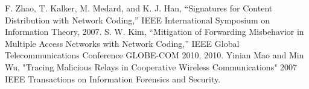 \documentclass[conference]{IEEEtran}
\begin{document}
\begin{thebibliography}{00}
 F. Zhao, T. Kalker, M. Medard, and K. J. Han, “Signatures for Content Distribution with Network Coding,” IEEE International Symposium on Information Theory, 2007.
 S. W. Kim, “Mitigation of Forwarding Misbehavior in Multiple Access Networks with Network Coding,” IEEE Global Telecommunications Conference GLOBE-COM 2010, 2010.
 Yinian Mao and Min Wu, "Tracing Malicious Relays in Cooperative Wireless Communications" 2007 IEEE Transactions on Information Forensics and Security.
 
\end{thebibliography}
\vspace{12pt}

\end{document}

